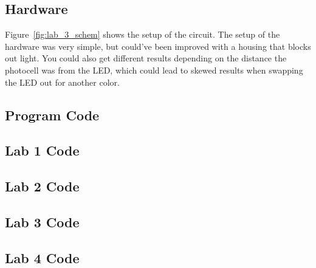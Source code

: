 \documentclass[12pt,titlepage]{article}
\begin{document}
\subsection{Hardware}
Figure~\ref{fig:lab_3_schem} shows the setup of the circuit. The setup of the hardware was very simple, but
could've been improved with a housing that blocks out light. You could also get different results depending
on the distance the photocell was from the LED, which could lead to skewed results when swapping the LED out
for another color.
\begin{appendices}
  \section{Program Code}
  \subsection{Lab 1 Code}
  \begin{minipage}{\linewidth}
    
  \end{minipage} 
  \begin{minipage}{\linewidth}
    
  \end{minipage} 
  \subsection{Lab 2 Code}
    
  \subsection{Lab 3 Code}
    
  \subsection{Lab 4 Code}
    
    
\end{appendices}
\end{document}
